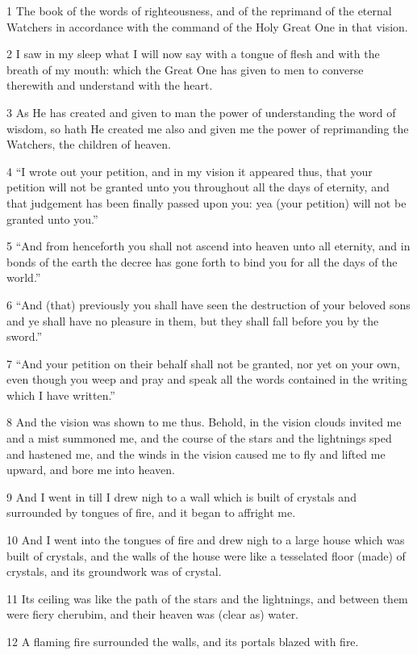 \par 1 The book of the words of righteousness, and of the reprimand of the eternal Watchers in accordance with the command of the Holy Great One in that vision.
\par 2 I saw in my sleep what I will now say with a tongue of flesh and with the breath of my mouth: which the Great One has given to men to converse therewith and understand with the heart.
\par 3 As He has created and given to man the power of understanding the word of wisdom, so hath He created me also and given me the power of reprimanding the Watchers, the children of heaven.
\par 4 “I wrote out your petition, and in my vision it appeared thus, that your petition will not be granted unto you throughout all the days of eternity, and that judgement has been finally passed upon you: yea (your petition) will not be granted unto you.”
\par 5 “And from henceforth you shall not ascend into heaven unto all eternity, and in bonds of the earth the decree has gone forth to bind you for all the days of the world.”
\par 6 “And (that) previously you shall have seen the destruction of your beloved sons and ye shall have no pleasure in them, but they shall fall before you by the sword.”
\par 7 “And your petition on their behalf shall not be granted, nor yet on your own, even though you weep and pray and speak all the words contained in the writing which I have written.”
\par 8 And the vision was shown to me thus. Behold, in the vision clouds invited me and a mist summoned me, and the course of the stars and the lightnings sped and hastened me, and the winds in the vision caused me to fly and lifted me upward, and bore me into heaven.
\par 9 And I went in till I drew nigh to a wall which is built of crystals and surrounded by tongues of fire, and it began to affright me.
\par 10 And I went into the tongues of fire and drew nigh to a large house which was built of crystals, and the walls of the house were like a tesselated floor (made) of crystals, and its groundwork was of crystal.
\par 11 Its ceiling was like the path of the stars and the lightnings, and between them were fiery cherubim, and their heaven was (clear as) water.
\par 12 A flaming fire surrounded the walls, and its portals blazed with fire.
